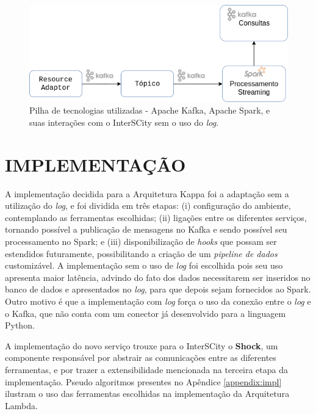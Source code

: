 \begin{figure}
  \centering
    \includegraphics[scale=0.5]{figuras/kappa_tools2.png}
  \caption{Pilha de tecnologias utilizadas - Apache Kafka, Apache Spark, e suas
    interações com o InterSCity sem o uso do \textit{log}.}
  \label{fig:stack2}
\end{figure}

\section{IMPLEMENTAÇÃO}

A implementação decidida para a Arquitetura Kappa foi a adaptação sem a utilização
do \textit{log}, e foi dividida em três etapas: (i) configuração do ambiente,
contemplando as ferramentas escolhidas; (ii) ligações entre os diferentes
serviços, tornando possível a publicação de mensagens no Kafka e sendo possível
seu processamento no Spark; e (iii) disponibilização de \textit{hooks} que
possam ser estendidos futuramente, possibilitando a criação de um
\textit{pipeline de dados} customizável. A implementação sem o uso de
\textit{log} foi escolhida pois seu uso apresenta maior latência, advindo
do fato dos dados necessitarem ser inseridos no banco de dados e apresentados no
\textit{log}, para que depois sejam fornecidos ao Spark. Outro motivo é que
a implementação com \textit{log} força o uso da conexão entre o \textit{log} e
o Kafka, que não conta com um conector já desenvolvido para a linguagem Python.

A implementação do novo serviço trouxe para o InterSCity o \textbf{Shock},
um componente responsável por abstrair as comunicações entre as diferentes
ferramentas, e por trazer a extensibilidade mencionada na terceira etapa da
implementação. Pseudo algoritmos presentes no Apêndice \ref{appendix:impl}
ilustram o uso das ferramentas escolhidas na implementação da Arquitetura
Lambda.

